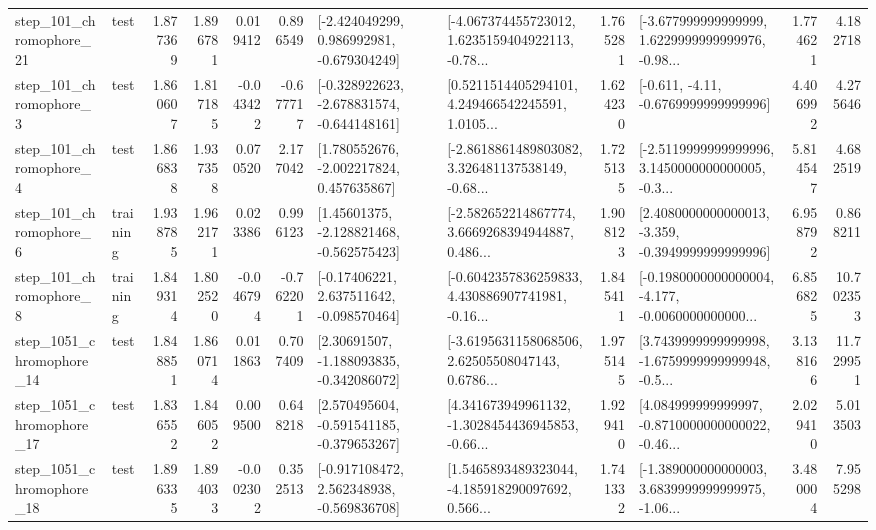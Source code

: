 \begin{tabular}{llrrrrllrlrr}
  step\_101\_chromophore\_21 &      test &      1.877369 &    1.896781 &      0.019412 &  0.896549 &   [-2.424049299, 0.986992981, -0.679304249] &  [-4.067374455723012, 1.6235159404922113, -0.78... &       1.765281 &  [-3.677999999999999, 1.6229999999999976, -0.98... &            1.774621 &          4.182718 \\
   step\_101\_chromophore\_3 &      test &      1.860607 &    1.817185 &     -0.043422 & -0.677717 &  [-0.328922623, -2.678831574, -0.644148161] &  [0.5211514405294101, 4.249466542245591, 1.0105... &       1.624230 &               [-0.611, -4.11, -0.6769999999999996] &            4.406992 &          4.275646 \\
   step\_101\_chromophore\_4 &      test &      1.866838 &    1.937358 &      0.070520 &  2.177042 &    [1.780552676, -2.002217824, 0.457635867] &  [-2.8618861489803082, 3.326481137538149, -0.68... &       1.725135 &  [-2.5119999999999996, 3.1450000000000005, -0.3... &            5.814547 &          4.682519 \\
   step\_101\_chromophore\_6 &  training &      1.938785 &    1.962171 &      0.023386 &  0.996123 &    [1.45601375, -2.128821468, -0.562575423] &  [-2.582652214867774, 3.6669268394944887, 0.486... &       1.908123 &  [2.4080000000000013, -3.359, -0.3949999999999996] &            6.958792 &          0.868211 \\
   step\_101\_chromophore\_8 &  training &      1.849314 &    1.802520 &     -0.046794 & -0.762201 &    [-0.17406221, 2.637511642, -0.098570464] &  [-0.6042357836259833, 4.430886907741981, -0.16... &       1.845411 &  [-0.1980000000000004, -4.177, -0.0060000000000... &            6.856825 &         10.702353 \\
 step\_1051\_chromophore\_14 &      test &      1.848851 &    1.860714 &      0.011863 &  0.707409 &    [2.30691507, -1.188093835, -0.342086072] &  [-3.6195631158068506, 2.62505508047143, 0.6786... &       1.975145 &  [3.7439999999999998, -1.6759999999999948, -0.5... &            3.138166 &         11.729951 \\
 step\_1051\_chromophore\_17 &      test &      1.836552 &    1.846052 &      0.009500 &  0.648218 &   [2.570495604, -0.591541185, -0.379653267] &  [4.341673949961132, -1.3028454436945853, -0.66... &       1.929410 &  [4.084999999999997, -0.8710000000000022, -0.46... &            2.029410 &          5.013503 \\
 step\_1051\_chromophore\_18 &      test &      1.896335 &    1.894033 &     -0.002302 &  0.352513 &   [-0.917108472, 2.562348938, -0.569836708] &  [1.5465893489323044, -4.185918290097692, 0.566... &       1.741332 &  [-1.389000000000003, 3.6839999999999975, -1.06... &            3.480004 &          7.955298 \\

\end{tabular}
